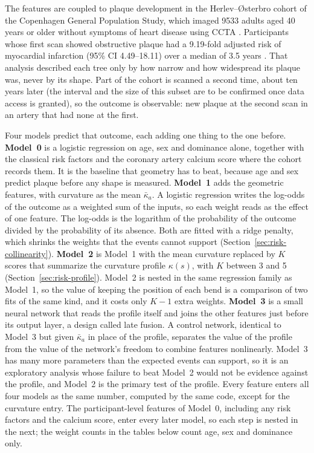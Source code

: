 The features are coupled to plaque development in the Herlev--{\O}sterbro cohort of the Copenhagen General Population Study, which imaged 9533 adults aged 40 years or older without symptoms of heart disease using CCTA \cite{fuchs2023cgps}.
Participants whose first scan showed obstructive plaque had a 9.19-fold adjusted risk of myocardial infarction (95\% CI 4.49--18.11) over a median of 3.5 years \cite{fuchs2023cgps}.
That analysis described each tree only by how narrow and how widespread its plaque was, never by its shape.
Part of the cohort is scanned a second time, about ten years later (the interval and the size of this subset are to be confirmed once data access is granted), so the outcome is observable: new plaque at the second scan in an artery that had none at the first.

Four models predict that outcome, each adding one thing to the one before.
\textbf{Model~0} is a logistic regression on age, sex and dominance alone, together with the classical risk factors and the coronary artery calcium score where the cohort records them.
It is the baseline that geometry has to beat, because age and sex predict plaque before any shape is measured.
\textbf{Model~1} adds the geometric features, with curvature as the mean $\bar\kappa_a$.
A logistic regression writes the log-odds of the outcome as a weighted sum of the inputs, so each weight reads as the effect of one feature.
The log-odds is the logarithm of the probability of the outcome divided by the probability of its absence.
Both are fitted with a ridge penalty, which shrinks the weights that the events cannot support (Section~\ref{sec:risk-collinearity}).
\textbf{Model~2} is Model~1 with the mean curvature replaced by $K$ scores that summarize the curvature profile $\kappa(s)$, with $K$ between 3 and 5 (Section~\ref{sec:risk-profile}).
Model~2 is nested in the same regression family as Model~1, so the value of keeping the position of each bend is a comparison of two fits of the same kind, and it costs only $K - 1$ extra weights.
\textbf{Model~3} is a small neural network that reads the profile itself and joins the other features just before its output layer, a design called late fusion.
A control network, identical to Model~3 but given $\bar\kappa_a$ in place of the profile, separates the value of the profile from the value of the network's freedom to combine features nonlinearly.
Model~3 has many more parameters than the expected events can support, so it is an exploratory analysis whose failure to beat Model~2 would not be evidence against the profile, and Model~2 is the primary test of the profile.
Every feature enters all four models as the same number, computed by the same code, except for the curvature entry.
The participant-level features of Model~0, including any risk factors and the calcium score, enter every later model, so each step is nested in the next; the weight counts in the tables below count age, sex and dominance only.

